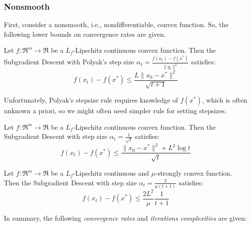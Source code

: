 
\subsubsection{Nonsmooth}

First, consider a nonsmooth, i.e., nondifferentiable, convex function. So, the following lower bounds on convergence rates are given.

\begin{theorem}[\href{http://www.princeton.edu/~yc5/ele522_optimization/lectures/subgradient_methods.pdf\#page=34}{Subgradient Descent convergence for convex functions with Polyak's stepsize}] \label{thm:cvx_polyak_subgd_convergence}
Let $f: \Re^m \rightarrow \Re$ be a $L_f$-Lipschitz continuous convex function. Then the Subgradient Descent with Polyak's step size $\displaystyle \alpha_t = \frac{f(x_t) - f(x^*)}{\| g_t \|^2}$ satisfies:
$$
f(x_t) - f(x^*) \leq \frac{L \| x_0 - x^* \|^2}{\sqrt{t+1}}
$$
\end{theorem}

Unfortunately, Polyak’s stepsize rule requires knowledge of $f(x^*)$, which is often unknown a priori, so we might often need simpler rule for setting stepsizes.

\begin{theorem}[\href{http://www.princeton.edu/~yc5/ele522_optimization/lectures/subgradient_methods.pdf\#page=39}{Subgradient Descent convergence for convex functions}] \label{thm:cvx_subgd_convergence}
Let $f: \Re^m \rightarrow \Re$ be a $L_f$-Lipschitz continuous convex function. Then the Subgradient Descent with step size $\displaystyle \alpha_t = \frac{1}{\sqrt{t}}$ satisfies:
$$
f(x_t) - f(x^*) \leq \frac{\| x_0 - x^* \|^2 + L^2 \log t}{\sqrt{t}}
$$
\end{theorem}

\begin{theorem}[\href{http://www.princeton.edu/~yc5/ele522_optimization/lectures/subgradient_methods.pdf\#page=41}{Subgradient Descent convergence for strongly convex functions}] \label{thm:str_cvx_subgd_convergence}
Let $f: \Re^m \rightarrow \Re$ be a $L_f$-Lipschitz continuous and $\mu$-strongly convex function. Then the Subgradient Descent with step size $\displaystyle \alpha_t = \frac{2}{\mu(t+1)}$ satisfies:
$$
f(x_t) - f(x^*) \leq \frac{2L^2}{\mu} \frac{1}{t+1}
$$
\end{theorem}

In summary, the following \emph{convergence rates} and \emph{iterations complexities} are given:

